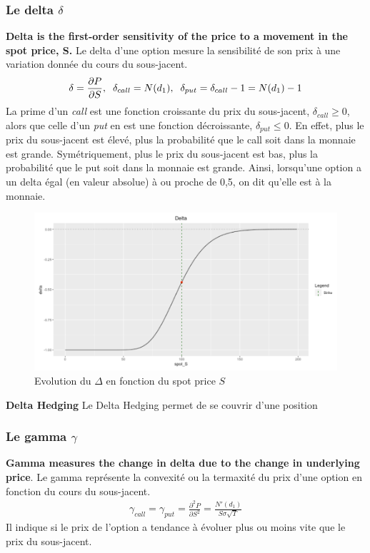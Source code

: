 \documentclass[a4paper]{article}
\begin{document}
 \subsubsection{Le delta $\delta$}
 \textbf{Delta is the first-order sensitivity of the price to a movement in the spot price, S.}
 Le delta d'une option mesure la sensibilité de son prix à une variation donnée du cours du sous-jacent.
 \begin{align*}
     \delta = \frac{\partial P}{\partial S}, \hspace{2mm} \delta_{call} = N(d_1), \hspace{2mm} \delta_{put} = \delta_{call} - 1 = N(d_1) - 1
 \end{align*}
La prime d'un \textit{call} est une fonction croissante du prix du sous-jacent, $\delta_{call} \geq 0$, alors que celle d'un \textit{put} en est une fonction décroissante, $\delta_{put} \leq 0$. En effet, plus le prix du sous-jacent est élevé, plus la probabilité que le call soit dans la monnaie est grande. Symétriquement, plus le prix du sous-jacent est bas, plus la probabilité que le put soit dans la monnaie est grande. Ainsi, lorsqu'une option a un delta égal (en valeur absolue) à ou proche de 0,5, on dit qu'elle est à la monnaie. 
\begin{figure}[H]
    \centering
    \includegraphics[scale=0.6]{figures/delta.png}
    \caption{Evolution du $\Delta$ en fonction du spot price $S$}
    \label{fig:enter-label}
\end{figure}

\textbf{Delta Hedging} Le Delta Hedging permet de se couvrir d'une position 
\subsubsection{Le gamma $\gamma$}
\textbf{Gamma measures the change in delta due to the change in underlying price}. Le gamma représente la convexité ou la termaxité du prix d'une option en fonction du cours du sous-jacent.
\begin{align*}
    \gamma_{call} = \gamma_{put} = \frac{\partial ^2 P}{\partial S ^2} = \frac{N'(d_1)}{S \sigma \sqrt{T}}
\end{align*}
Il indique si le prix de l'option a tendance à évoluer plus ou moins vite que le prix du sous-jacent.
\end{document}

